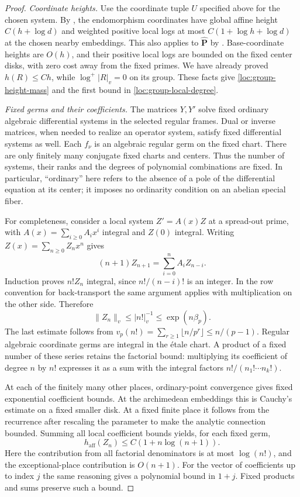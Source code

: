 \begin{proof}
\emph{Coordinate heights.}
Use the coordinate tuple $U$ specified above for the chosen system.
By , the endomorphism coordinates have
global affine height $C(h+\log d)$ and weighted positive local logs
at most $C(1+\log h+\log d)$ at the chosen nearby embeddings.  This
also applies to $\widehat{\mathbf P}$ by
.  Base-coordinate heights are $O(h)$, and their
positive local logs are bounded on the fixed center disks, with zero
cost away from the fixed primes.  We have already proved $h(R)\leq
Ch$, while $\log^+|R|_v=0$ on its group.  These facts give
\eqref{loc:group-height-mass} and the first bound in
\eqref{loc:group-local-degree}.

\emph{Fixed germs and their coefficients.}
The matrices $Y,Y'$ solve fixed ordinary algebraic differential
systems in the selected regular frames.  Dual or inverse matrices,
when needed to realize an operator system, satisfy fixed differential
systems as well.  Each $f_\nu$ is an algebraic regular germ on the
fixed chart.  There are only finitely many conjugate fixed charts and
centers.  Thus the number of systems, their ranks and the degrees of
polynomial combinations are fixed.  In particular, ``ordinary'' here
refers to the absence of a pole of the differential equation at its
center; it imposes no ordinarity condition on an abelian special fiber.

For completeness, consider a local system $Z'=A(x)Z$ at a spread-out
prime, with $A(x)=\sum_{i\geq0}A_i x^i$ integral and $Z(0)$ integral.
Writing $Z(x)=\sum_{n\geq0}Z_nx^n$ gives
\[
 (n+1)Z_{n+1}=\sum_{i=0}^n A_iZ_{n-i}.
\]
Induction proves $n!Z_n$ integral, since $n!/(n-i)!$ is an integer.
In the row convention for back-transport the same argument applies
with multiplication on the other side.  Therefore
\begin{equation}\label{loc:factorial}
 \|Z_n\|_v\leq |n!|_v^{-1}
 \leq \exp(n\beta_p).
\end{equation}
The last estimate follows from
$v_p(n!)=\sum_{r\geq1}\lfloor n/p^r\rfloor\leq n/(p-1)$.
Regular algebraic coordinate germs are integral in the \'etale chart.
A product of a fixed number of these series retains the factorial
bound: multiplying its coefficient of degree $n$ by $n!$ expresses it
as a sum with the integral factors $n!/(n_1!\cdots n_k!)$.

At each of the finitely many other places, ordinary-point convergence
gives fixed exponential coefficient bounds.  At the archimedean
embeddings this is Cauchy's estimate on a fixed smaller disk.  At a
fixed finite place it follows from the recurrence after rescaling the
parameter to make the analytic connection bounded.  Summing all local
coefficient bounds yields, for each fixed germ,
\[
 h_{\mathrm{aff}}(Z_n)\leq C(1+n\log(n+1)).
\]
Here the contribution from all factorial denominators is at most
$\log(n!)$, and the exceptional-place contribution is $O(n+1)$.
For the vector of coefficients up to index $j$ the same reasoning
gives a polynomial bound in $1+j$.  Fixed products and sums preserve
such a bound.


\end{proof}
